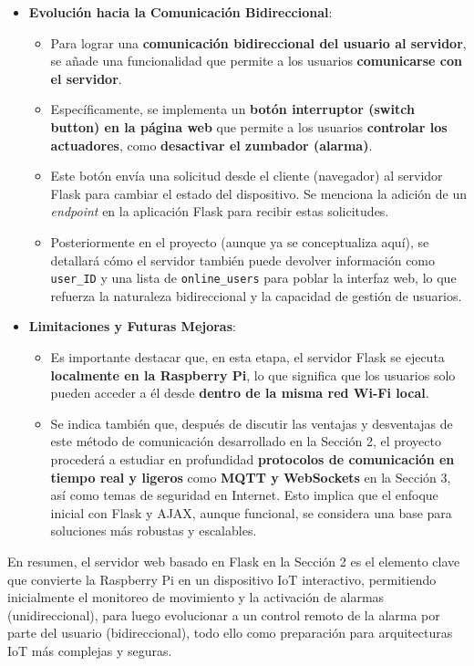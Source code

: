 \documentclass{report}
\begin{document}
\begin{itemize}
    \item \textbf{Evolución hacia la Comunicación Bidireccional}:
    \begin{itemize}
        \item Para lograr una \textbf{comunicación bidireccional del usuario al servidor}, se añade una funcionalidad que permite a los usuarios 
        \textbf{comunicarse con el servidor}.
        \item Específicamente, se implementa un \textbf{botón interruptor (switch button) en la página web} que permite a los usuarios 
        \textbf{controlar los actuadores}, como \textbf{desactivar el zumbador (alarma)}.
        \item Este botón envía una solicitud desde el cliente (navegador) al servidor Flask para cambiar el estado del dispositivo. Se 
        menciona la adición de un \textit{endpoint} en la aplicación Flask para recibir estas solicitudes.
        \item Posteriormente en el proyecto (aunque ya se conceptualiza aquí), se detallará cómo el servidor también puede devolver información 
        como \verb|user_ID| y una lista de \verb|online_users| para poblar la interfaz web, lo que refuerza la naturaleza bidireccional y la capacidad 
        de gestión de usuarios.
    \end{itemize}

    \item \textbf{Limitaciones y Futuras Mejoras}:
    \begin{itemize}
        \item Es importante destacar que, en esta etapa, el servidor Flask se ejecuta \textbf{localmente en la Raspberry Pi}, lo que significa que los 
        usuarios solo pueden acceder a él desde \textbf{dentro de la misma red Wi-Fi local}.
        \item Se indica también que, después de discutir las ventajas y desventajas de este método de comunicación desarrollado en la Sección 2, 
        el proyecto procederá a estudiar en profundidad \textbf{protocolos de comunicación en tiempo real y ligeros} como \textbf{MQTT y WebSockets} en 
        la Sección 3, así como temas de seguridad en Internet. Esto implica que el enfoque inicial con Flask y AJAX, aunque funcional, se considera 
        una base para soluciones más robustas y escalables.
    \end{itemize}
\end{itemize}
En resumen, el servidor web basado en Flask en la Sección 2 es el elemento clave que convierte la Raspberry Pi en un dispositivo IoT interactivo, 
permitiendo inicialmente el monitoreo de movimiento y la activación de alarmas (unidireccional), para luego evolucionar a un control remoto de la 
alarma por parte del usuario (bidireccional), todo ello como preparación para arquitecturas IoT más complejas y seguras.
\end{document}
